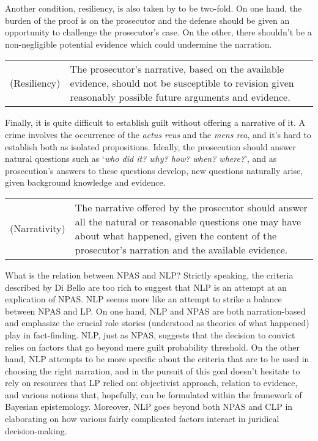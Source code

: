 \documentclass[10pt,leqno]{article}
\begin{document}
Another condition, resiliency, is also taken by \citet[210]{di2013statistics} to be two-fold. On one hand, the burden of the proof is on the prosecutor and the defense should be given an opportunity to challenge the prosecutor's case. On the other,  there shouldn't be a non-negligible potential evidence which could undermine the narration.


 \begin{center}
\begin{tabular}{lp{8.5cm}}
(Resiliency)&  The prosecutor's narrative, based on the available evidence, should not be susceptible to revision given reasonably possible future arguments and evidence.
\end{tabular}\end{center}

Finally, it is quite difficult to establish guilt without offering a narrative  of it. A crime involves  the occurrence of the \emph{actus reus} and the \emph{mens rea}, and it's hard to establish both as isolated propositions. Ideally, the prosecution  should answer natural questions such as `\emph{who did it? why? how? when? where?}', and as prosecution's answers to these questions develop, new questions naturally arise, given background knowledge and evidence.



 \begin{center}
\begin{tabular}{lp{8.5cm}}
(Narrativity) & The narrative offered by the prosecutor should answer all 
the natural or reasonable questions one may have about what happened, given the content of the prosecutor's narration and the available evidence.
\end{tabular}\end{center}




What is the relation between NPAS  and NLP? Strictly speaking, the criteria described by Di Bello are too rich to suggest that NLP is an attempt at an explication of NPAS. NLP seems more like an attempt to strike a balance between NPAS and LP. On one hand, NLP and NPAS are both narration-based and emphasize the crucial role stories (understood as theories of what happened) play in fact-finding. NLP, just as NPAS, suggests that the decision to convict relies on  factors that go beyond mere guilt probability threshold. On the other hand, NLP attempts to be more specific about the criteria that are to be used in choosing the right narration, and in the pursuit of this goal doesn't hesitate to rely on resources that LP relied on: objectivist approach, relation to evidence, and various notions that, hopefully, can be formulated within the framework of Bayesian epistemology. Moreover, NLP goes beyond both NPAS and CLP in elaborating on how various fairly complicated factors interact in juridical decision-making.
\end{document}
